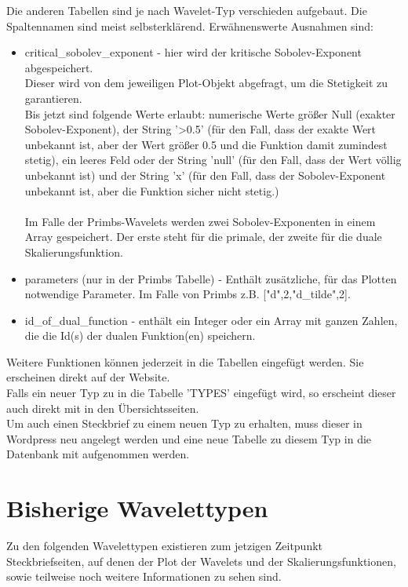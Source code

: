 \documentclass[11pt,a4paper,titlepage]{article}
\theoremstyle{plain} %
\theoremstyle{definition} %
\numberwithin{equation}{section} %
\begin{document}
	Die anderen Tabellen sind je nach Wavelet-Typ verschieden aufgebaut. Die Spaltennamen sind meist selbsterklärend. Erwähnenswerte Ausnahmen sind:
	\begin{itemize}
		\item critical\_sobolev\_exponent - hier wird der kritische Sobolev-Exponent abgespeichert.\\
		Dieser wird von dem jeweiligen Plot-Objekt abgefragt, um die Stetigkeit zu garantieren. \\
		Bis jetzt sind folgende Werte erlaubt: numerische Werte größer Null (exakter Sobolev-Exponent), der String '>0.5' (für den Fall, dass der exakte Wert unbekannt ist, aber der Wert größer 0.5 und die Funktion damit zumindest stetig), ein leeres Feld oder der String 'null' (für den Fall, dass der Wert völlig unbekannt ist) und der String 'x' (für den Fall, dass der Sobolev-Exponent unbekannt ist, aber die Funktion sicher nicht stetig.)\\
		\\
		Im Falle der Primbs-Wavelets werden zwei Sobolev-Exponenten in einem Array gespeichert. Der erste steht für die primale, der zweite für die duale Skalierungsfunktion.
		\item parameters (nur in der Primbs Tabelle) - Enthält zusätzliche, für das Plotten notwendige Parameter. Im Falle von Primbs z.B. ["d",2,"d\_tilde",2].
		\item id\_of\_dual\_function - enthält ein Integer oder ein Array mit ganzen Zahlen, die die Id(s) der dualen Funktion(en) speichern. \\
	\end{itemize}

	
	Weitere Funktionen können jederzeit in die Tabellen eingefügt werden. Sie erscheinen direkt auf der Website. \\
	Falls ein neuer Typ zu in die Tabelle 'TYPES' eingefügt wird, so erscheint dieser auch direkt mit in den Übersichtsseiten. \\
	Um auch einen Steckbrief zu einem neuen Typ zu erhalten, muss dieser in Wordpress neu angelegt werden und eine neue Tabelle zu diesem Typ in die Datenbank mit aufgenommen werden.

	\section{Bisherige Wavelettypen}
		Zu den folgenden Wavelettypen existieren zum jetzigen Zeitpunkt Steckbriefseiten, auf denen der Plot der Wavelets und der Skalierungsfunktionen, sowie teilweise noch weitere Informationen zu sehen sind.
\end{document}
